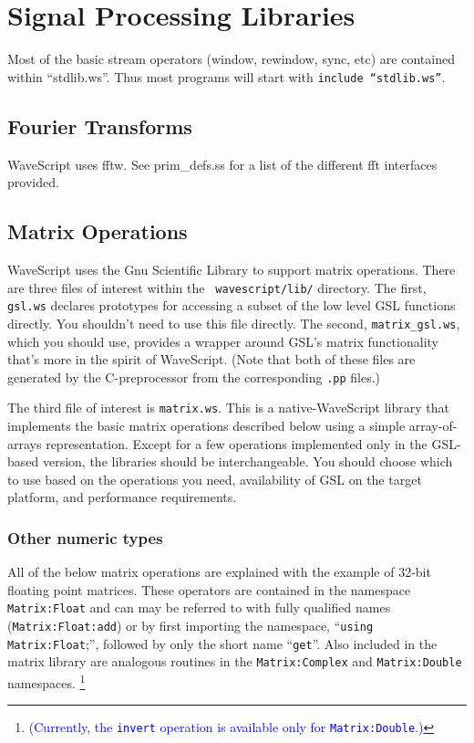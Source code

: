 \documentclass[twocolumn]{report}
\newcommand{\rednote}[1]{{\textcolor{blue}{#1}}}
\begin{document}
\chapter{Signal Processing Libraries}

Most of the basic stream operators (window, rewindow, sync, etc) are
contained within ``stdlib.ws''.  Thus most programs will start with
{\tt include ``stdlib.ws''}.

\section{Fourier Transforms}

WaveScript uses fftw.  See prim\_defs.ss for a list of the different
fft interfaces provided.




\section{Matrix Operations}

WaveScript uses the Gnu Scientific Library to support matrix
operations.  There are three files of interest within the {\tt
wavescript/lib/} directory.  The first, {\tt gsl.ws} declares
prototypes for accessing a subset of the low level GSL functions
directly.  You shouldn't need to use this file directly.  The second,
{\tt matrix\_gsl.ws}, which you should use, provides a wrapper around
GSL's matrix functionality that's more in the spirit of WaveScript.
(Note that both of these files are generated by the C-preprocessor from
the corresponding {\tt .pp} files.)

The third file of interest is {\tt matrix.ws}.  This is a
native-WaveScript library that implements the basic matrix operations
described below using a simple array-of-arrays representation.  Except
for a few operations implemented only in the GSL-based version,
the libraries should be interchangeable.  You should choose which to
use based on the operations you need, availability of GSL on the
target platform, and performance requirements.

\subsection{Other numeric types}

All of the below matrix operations are explained with the example of
32-bit floating point matrices.  These operators are contained in the
namespace {\tt Matrix:Float} and can may be referred to with fully
qualified names ({\tt Matrix:Float:add}) or by first importing the
namespace, ``{\tt using Matrix:Float};'', followed by only the short
name ``{\tt get}''.  Also included in the matrix library are analogous
routines in the {\tt Matrix:Complex} and {\tt Matrix:Double} namespaces.
\footnote{\rednote{(Currently, the {\tt invert} operation is available only for
{\tt Matrix:Double}.)}}
\end{document}
